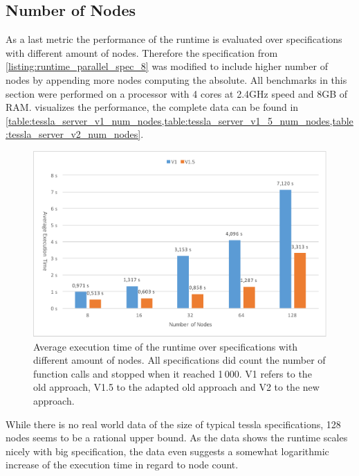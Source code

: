 \subsection{Number of Nodes}

As a last metric the performance of the runtime is evaluated over specifications with different amount of nodes.
Therefore the specification from \cref{listing:runtime_parallel_spec_8} was modified to include higher number of nodes by appending more nodes computing the absolute.
All benchmarks in this section were performed on a processor with 4 cores at 2.4GHz speed and 8GB of RAM.
 visualizes the performance, the complete data can be found in \cref{table:tessla_server_v1_num_nodes,table:tessla_server_v1_5_num_nodes,table:tessla_server_v2_num_nodes}.

\begin{figure}
  \includegraphics[width=\textwidth]{gfx/runtime_num_nodes_benchmark}
  \caption[Average execution time of the runtime over specifications with different amount of nodes.]{Average execution time of the runtime over specifications with different amount of nodes. All specifications did count the number of function calls and stopped when it reached 1\,000. V1 refers to the old approach, V1.5 to the adapted old approach and V2 to the new approach.}
\label{fig:chap_eval:runtime_num_nodes}
\end{figure}

While there is no real world data of the size of typical \gls{tessla} specifications, 128 nodes seems to be a rational upper bound.
As the data shows the runtime scales nicely with big specification, the data even suggests a somewhat logarithmic increase of the execution time in regard to node count.


